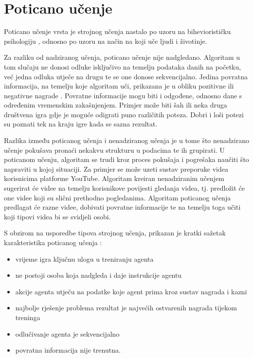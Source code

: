 \documentclass[]{foi} %
\begin{document}
\chapter{Poticano učenje}
\label{cha:Poticano}
Poticano učenje vrsta je strojnog učenja nastalo po uzoru na biheviorističku psihologiju  \cite[str. 71]{AIandGames}, odnosno po uzoru na način na koji uče ljudi i životinje. 

Za razliku od nadziranog učenja, poticano učenje nije nadgledano. Algoritam u tom slučaju ne donosi odluke isključivo na temelju podataka danih na početku, već jedna odluka utječe na drugu te se one donose sekvencijalno. Jedina povratna informacija, na temelju koje algoritam uči, prikazana je u obliku pozitivne ili negativne nagrade \cite[str. 71]{AIandGames}. Povratne informacije mogu biti i odgođene, odnosno dane s određenim vremenskim zakašnjenjem. Primjer može biti šah ili neka druga društvena igra gdje je moguće odigrati puno različitih poteza. Dobri i loši potezi su poznati tek na kraju igre kada se sazna rezultat. 

Razlika između poticanog učenja i nenadziranog učenja je u tome što nenadzirano učenje pokušava pronaći nekakvu strukturu u podacima te ih grupirati. U poticanom učenju, algoritam se trudi kroz proces pokušaja i pogrešaka naučiti što napraviti u kojoj situaciji. Za primjer se može uzeti sustav preporuke videa korisnicima platforme YouTube. Algoritam kreiran nenadziranim učenjem sugerirat će videe na temelju korisnikove povijesti gledanja videa, tj. predložit će one videe koji su slični prethodno pogledanima. Algoritam poticanog učenja predlagat će razne videe, dobivati povratne informacije te na temelju toga učiti koji tipovi videa bi se svidjeli osobi.

S obzirom na usporedbe tipova strojnog učenja, prikazan je kratki sažetak karakteristika poticanog učenja \cite{RLkarakt}:
\begin{itemize}
    \item vrijeme igra ključnu ulogu u treniranju agenta
    \item ne postoji osoba koja nadgleda i daje instrukcije agentu
    \item akcije agenta utječu na podatke koje agent prima kroz sustav nagrada i kazni
    \item najbolje rješenje problema rezultat je najvećih ostvarenih nagrada tijekom treninga
    \item odlučivanje agenta je sekvencijalno
    \item povratna informacija nije trenutna.
\end{itemize}
\end{document}
